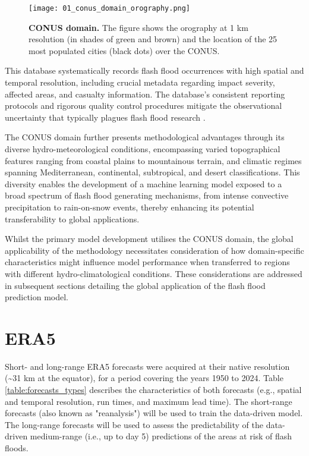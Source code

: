 \begin{figure}[htbp]
\centering
\texttt{[image: 01\_conus\_domain\_orography.png]}
\caption{\textbf{CONUS domain.} The figure shows the orography at 1 km resolution (in shades of green and brown) and the location of the 25 most populated cities (black dots) over the CONUS.}
\label{fig:conus_domain}
\end{figure}

This database systematically records flash flood occurrences with high spatial and temporal resolution, including crucial metadata regarding impact severity, affected areas, and casualty information. The database's consistent reporting protocols and rigorous quality control procedures mitigate the observational uncertainty that typically plagues flash flood research \citep{Panwar_2020}.

The CONUS domain further presents methodological advantages through its diverse hydro-meteorological conditions, encompassing varied topographical features ranging from coastal plains to mountainous terrain, and climatic regimes spanning Mediterranean, continental, subtropical, and desert classifications. This diversity enables the development of a machine learning model exposed to a broad spectrum of flash flood generating mechanisms, from intense convective precipitation to rain-on-snow events, thereby enhancing its potential transferability to global applications.

Whilst the primary model development utilises the CONUS domain, the global applicability of the methodology necessitates consideration of how domain-specific characteristics might influence model performance when transferred to regions with different hydro-climatological conditions. These considerations are addressed in subsequent sections detailing the global application of the flash flood prediction model.


\section{ERA5}

Short- and long-range ERA5 forecasts were acquired at their native resolution (\textasciitilde31 km at the equator), for a period covering the years 1950 to 2024. Table \ref{table:forecasts_types} describes the characteristics of both forecasts (e.g., spatial and temporal resolution, run times, and maximum lead time). The short-range forecasts (also known as "reanalysis") will be used to train the data-driven model. The long-range forecasts will be used to assess the predictability of the data-driven medium-range (i.e., up to day 5) predictions of the areas at risk of flash floods.

